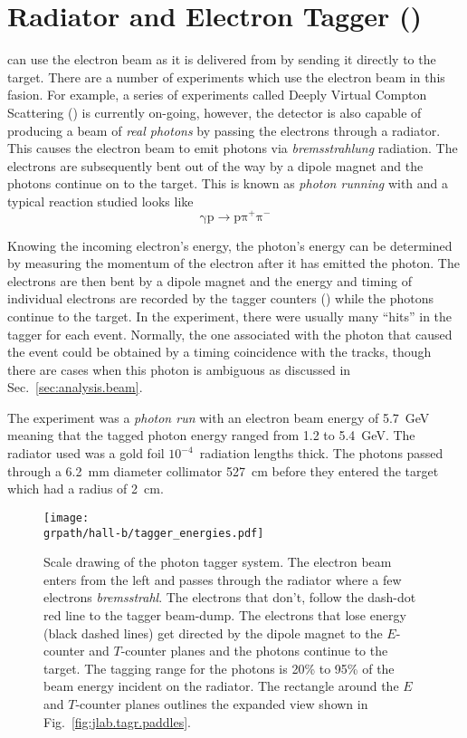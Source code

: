 \section{\label{sec:clas.tagr}Radiator and Electron Tagger ()}

 can use the electron beam as it is delivered from  by sending it directly to the target. There are a number of experiments which use the electron beam in this fasion. For example, a series of experiments called Deeply Virtual Compton Scattering (\label{abbr:dvcs}) is currently on-going\cite{avakian2010}, however, the detector is also capable of producing a beam of \emph{real photons} by passing the electrons through a radiator. This causes the electron beam to emit photons via \emph{bremsstrahlung} radiation. The electrons are subsequently bent out of the way by a dipole magnet and the photons continue on to the target. This is known as \emph{photon running} with  and a typical reaction studied looks like
\begin{equation}
	\mathrm{\gamma p \rightarrow p \pi^{+}  \pi^{-}}
\end{equation}

Knowing the incoming electron's energy, the photon's energy can be determined by measuring the momentum of the electron after it has emitted the photon. The electrons are then bent by a dipole magnet and the energy and timing of individual electrons are recorded by the tagger counters\cite{clas.tagger} () while the photons continue to the target.  In the  experiment, there were usually many ``hits'' in the tagger for each event. Normally, the one associated with the photon that caused the event could be obtained by a timing coincidence with the tracks, though there are cases when this photon is ambiguous as discussed in Sec.~\ref{sec:analysis.beam}.

The  experiment was a \emph{photon run} with an electron beam energy of 5.7~GeV meaning that the tagged photon energy ranged from 1.2 to 5.4~GeV. The radiator used was a gold foil $10^{-4}$~radiation lengths thick. The photons passed through a 6.2~mm diameter collimator 527~cm before they entered the target which had a radius of 2~cm.

\begin{figure}\begin{center}
\texttt{[image: \\grpath/hall-b/tagger\_energies.pdf]}
\caption[Tagger Schematic - Energies]{\label{fig:jlab.tagr.energies}Scale drawing of the photon tagger system. The electron beam enters from the left and passes through the radiator where a few electrons \emph{bremsstrahl}. The electrons that don't, follow the dash-dot red line to the tagger beam-dump. The electrons that lose energy (black dashed lines) get directed by the dipole magnet to the $E$-counter and $T$-counter planes and the photons continue to the target. The tagging range for the photons is 20\% to 95\% of the beam energy incident on the radiator. The rectangle around the $E$ and $T$-counter planes outlines the expanded view shown in Fig.~\ref{fig:jlab.tagr.paddles}.}
\end{center}\end{figure}

